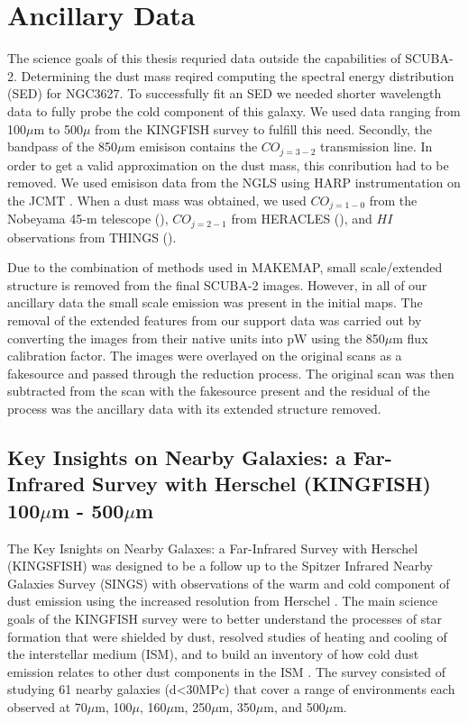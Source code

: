 \section{Ancillary Data}

The science goals of this thesis requried data outside the capabilities of SCUBA-2.  Determining the dust mass reqired computing the spectral energy distribution (SED) for NGC3627.  To successfully fit an SED we needed shorter wavelength data to fully probe the cold component of this galaxy. We used data ranging from 100$\mu$m to 500$\mu$ from the KINGFISH survey \citet{kennicutt2011} to fulfill this need.  Secondly, the bandpass of the 850$\mu$m emisison contains the $CO_{j=3-2}$ transmission line.  In order to get a valid approximation on the dust mass, this conribution had to be removed.  We used emisison data from the NGLS using HARP instrumentation on the JCMT \citet{wilson2012}.  When a dust mass was obtained, we used $CO_{j=1-0}$ from the Nobeyama 45-m telescope (\citet{kuno2007}), $CO_{j=2-1}$ from HERACLES (\citet{leroy2007}), and $HI$ observations from THINGS (\citet{walter2008}).

Due to the combination of methods used in MAKEMAP, small scale/extended structure is removed from the final SCUBA-2 images.  However, in all of our ancillary data the small scale emission was present in the initial maps.  The removal of the extended features from our support data was carried out by converting the images from their native units into pW using the 850$\mu$m flux calibration factor.  The images were overlayed on the original scans as a fakesource and passed through the reduction process.  The original scan was then subtracted from the scan with the fakesource present and the residual of the process was the ancillary data with its extended structure removed.%

\subsection{Key Insights on Nearby Galaxies: a Far-Infrared Survey with Herschel (KINGFISH) 100$\mu$m - 500$\mu$m}

The Key Isnights on Nearby Galaxes: a Far-Infrared Survey with Herschel (KINGSFISH) was designed to be a follow up to the Spitzer Infrared Nearby Galaxies Survey (SINGS) with observations of the warm and cold component of dust emission using the increased resolution from Herschel \citet{kennitcutt2011}.  The main science goals of the KINGFISH survey were to better understand the processes of star formation that were shielded by dust, resolved studies of heating and cooling of the interstellar medium (ISM), and to build an inventory of how cold dust emission relates to other dust components in the ISM \citet{kennicutt2011}.  The survey consisted of studying 61 nearby galaxies (d<30MPc) that cover a range of environments each observed at 70$\mu$m, 100$\mu$, 160$\mu$m, 250$\mu$m, 350$\mu$m, and 500$\mu$m.  

